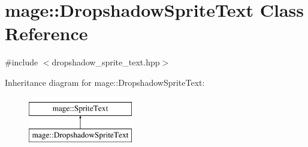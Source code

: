 \hypertarget{classmage_1_1_dropshadow_sprite_text}{}\section{mage\+:\+:Dropshadow\+Sprite\+Text Class Reference}
\label{classmage_1_1_dropshadow_sprite_text}


{\ttfamily \#include $<$dropshadow\+\_\+sprite\+\_\+text.\+hpp$>$}

Inheritance diagram for mage\+:\+:Dropshadow\+Sprite\+Text\+:\begin{figure}[H]
\begin{center}
\leavevmode
\includegraphics[height=2.000000cm]{classmage_1_1_dropshadow_sprite_text}
\end{center}
\end{figure}
